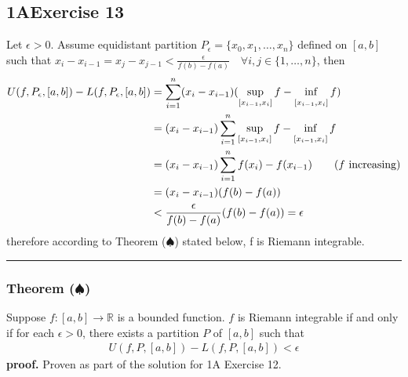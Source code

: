 \documentclass[12pt, letterpaper]{article}
\newcommand{\R}{\mathbb{R}}
\renewcommand{\L}{L}
\newcommand{\U}{U}
\renewcommand{\inf}{\mathop{\mathrm{inf}\vphantom{\mathrm{sup}}}}
\begin{document}
{\subsection*{1\hspace{1pt}A\hspace{20pt}Exercise 13}
Let $\epsilon>0$. Assume equidistant partition $P_\epsilon=\{x_0, x_1, \dots, x_n\}$ defined on $[a,b]$ such that $x_i-x_{i-1}=x_j-x_{j-1}<\frac{\epsilon}{f(b)-f(a)}\quad \forall i,j\in\{1,\dots,n\}$, then
\begin{align*}
    \U(f, P_\epsilon, [a,b])-\L(f, P_\epsilon, [a,b])&=\sum_{i=1}^n(x_i-x_{i-1})(\sup_{[x_{i-1}, x_i]}f-\inf_{[x_{i-1}, x_i]}f)\\
    &=(x_i-x_{i-1})\sum_{i=1}^n\sup_{[x_{i-1}, x_i]}f-\inf_{[x_{i-1}, x_i]}f\\
    &=(x_i-x_{i-1})\sum_{i=1}^nf(x_i)-f(x_{i-1})\qquad \text{($f$ increasing)}\\
    &=(x_i-x_{i-1})(f(b)-f(a))\\
    &< \frac{\epsilon}{f(b)-f(a)}(f(b)-f(a))=\epsilon
\end{align*}
therefore according to Theorem ($\spadesuit$) stated below, f is Riemann integrable.\\

\hrule

\subsubsection*{Theorem ($\spadesuit$)}
{\color{violet}Suppose $f: [a,b]\rightarrow \R$ is a bounded function. $f$ is Riemann integrable if and only if for each $\epsilon>0$, there exists a partition $P$ of $[a,b]$ such that 
\begin{align*}
    \U(f, P, [a,b])-\L(f, P, [a,b])<\epsilon
\end{align*}
}\textbf{proof.} Proven as part of the solution for {\color{blue}1A Exercise 12}.
\clearpage

}
\end{document}
